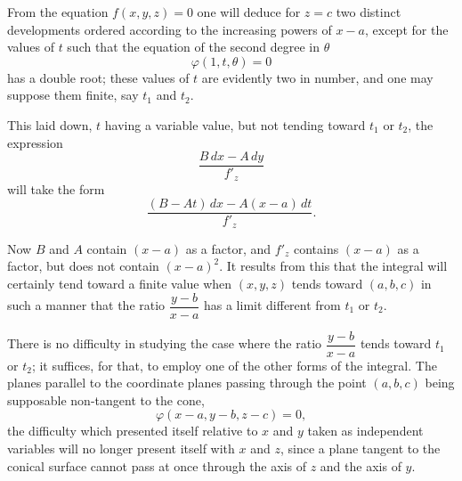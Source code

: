 \documentclass{article}
\begin{document}

From the equation $f(x, y, z) = 0$ one will deduce for $z = c$ two distinct developments ordered according to the increasing powers of $x - a$, except for the values of $t$ such that the equation of the second degree in $\theta$
\[
\varphi(1, t, \theta) = 0
\]
has a double root; these values of $t$ are evidently two in number, and one may suppose them finite, say $t_{1}$ and $t_{2}$.

This laid down, $t$ having a variable value, but not tending toward $t_{1}$ or $t_{2}$, the expression
\[
\frac{B\,dx - A\,dy}{f'_{z}}
\]
will take the form
\[
\frac{(B - At)\,dx - A(x - a)\,dt}{f'_{z}}.
\]

Now $B$ and $A$ contain $(x - a)$ as a factor, and $f'_{z}$ contains $(x - a)$ as a factor, but does not contain $(x - a)^{2}$. It results from this that the integral will certainly tend toward a finite value when $(x, y, z)$ tends toward $(a, b, c)$ in such a manner that the ratio $\dfrac{y - b}{x - a}$ has a limit different from $t_{1}$ or $t_{2}$.

There is no difficulty in studying the case where the ratio $\dfrac{y - b}{x - a}$ tends toward $t_{1}$ or $t_{2}$; it suffices, for that, to employ one of the other forms of the integral. The planes parallel to the coordinate planes passing through the point $(a, b, c)$ being supposable non-tangent to the cone,
\[
\varphi(x - a, y - b, z - c) = 0,
\]
the difficulty which presented itself relative to $x$ and $y$ taken as independent variables will no longer present itself with $x$ and $z$, since a plane tangent to the conical surface cannot pass at once through the axis of $z$ and the axis of $y$.
\end{document}
